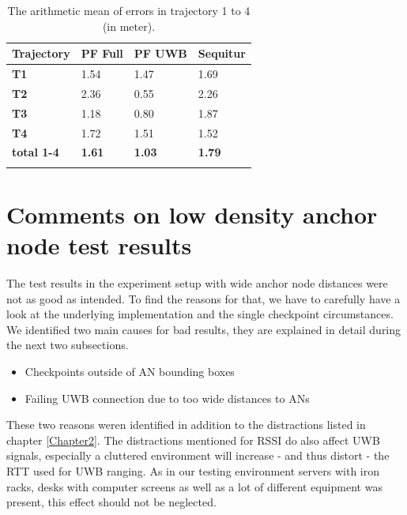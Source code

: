\begin{table}
\caption{The arithmetic mean of errors in trajectory 1 to 4 (in meter).}
\label{tab:arithmetic_errors}
\centering
\begin{tabular}{l l l l}
\toprule
\textbf{Trajectory} & \textbf{PF Full} & \textbf{PF UWB} & \textbf{Sequitur}\\
\midrule
\textbf{T1} & 1.54 & 1.47 & 1.69\\
\textbf{T2} & 2.36 & 0.55 & 2.26\\
\textbf{T3} & 1.18 & 0.80 & 1.87\\
\textbf{T4} & 1.72 & 1.51 & 1.52\\
\midrule
\textbf{total 1-4}  & \textbf{1.61} & \textbf{1.03} & \textbf{1.79}\\
\bottomrule\\
\end{tabular}
\end{table}


\section{Comments on low density anchor node test results}
\label{Section2}
The test results in the experiment setup with wide anchor node distances were not as good as intended. To find the reasons for that, we have to carefully have a look at the underlying implementation and the single checkpoint circumstances. We identified two main causes for bad results, they are explained in detail during the next two subsections.
\begin{itemize}
\item Checkpoints outside of AN bounding boxes
\item Failing UWB connection due to too wide distances to ANs
\end{itemize}
These two reasons weren identified in addition to the distractions listed in chapter \ref{Chapter2}. The distractions mentioned for RSSI do also affect UWB signals, especially a cluttered environment will increase - and thus distort - the RTT used for UWB ranging. As in our testing environment servers with iron racks, desks with computer screens as well as a lot of different equipment was present, this effect should not be neglected.

